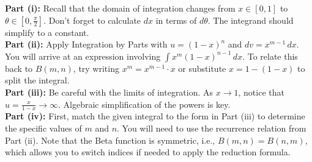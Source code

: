 \begin{hint}
\textbf{Part (i):} Recall that the domain of integration changes from $x \in [0,1]$ to $\theta \in [0, \frac{\pi}{2}]$. Don't forget to calculate $dx$ in terms of $d\theta$. The integrand should simplify to a constant.\\
\textbf{Part (ii):} Apply Integration by Parts with $u = (1-x)^n$ and $dv = x^{m-1} \, dx$. You will arrive at an expression involving $\int x^m (1-x)^{n-1} \, dx$. To relate this back to $B(m,n)$, try writing $x^m = x^{m-1} \cdot x$ or substitute $x = 1 - (1-x)$ to split the integral.\\
\textbf{Part (iii):} Be careful with the limits of integration. As $x \to 1$, notice that $u = \frac{x}{1-x} \to \infty$. Algebraic simplification of the powers is key.\\
\textbf{Part (iv):} First, match the given integral to the form in Part (iii) to determine the specific values of $m$ and $n$. You will need to use the recurrence relation from Part (ii). Note that the Beta function is symmetric, i.e., $B(m,n) = B(n,m)$, which allows you to switch indices if needed to apply the reduction formula.
\end{hint}

